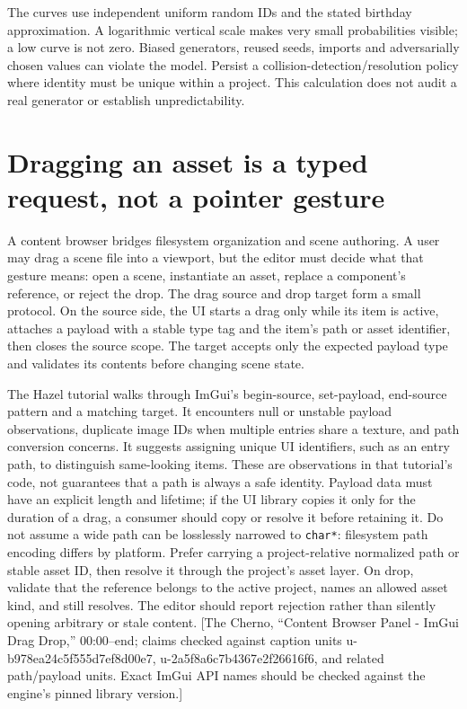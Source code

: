 The curves use independent uniform random IDs and the stated birthday approximation. A logarithmic vertical scale makes very small probabilities visible; a low curve is not zero. Biased generators, reused seeds, imports and adversarially chosen values can violate the model. Persist a collision-detection/resolution policy where identity must be unique within a project. This calculation does not audit a real generator or establish unpredictability.

\section{Dragging an asset is a typed request, not a pointer gesture}\label{06-engine-ii-ch047-dragging-an-asset-is-a-typed-request-not-a-pointer-gesture}

A content browser bridges filesystem organization and scene authoring. A user may drag a scene file into a viewport, but the editor must decide what that gesture means: open a scene, instantiate an asset, replace a component's reference, or reject the drop. The drag source and drop target form a small protocol. On the source side, the UI starts a drag only while its item is active, attaches a payload with a stable type tag and the item's path or asset identifier, then closes the source scope. The target accepts only the expected payload type and validates its contents before changing scene state.

The Hazel tutorial walks through ImGui's begin-source, set-payload, end-source pattern and a matching target. It encounters null or unstable payload observations, duplicate image IDs when multiple entries share a texture, and path conversion concerns. It suggests assigning unique UI identifiers, such as an entry path, to distinguish same-looking items. These are observations in that tutorial's code, not guarantees that a path is always a safe identity. Payload data must have an explicit length and lifetime; if the UI library copies it only for the duration of a drag, a consumer should copy or resolve it before retaining it. Do not assume a wide path can be losslessly narrowed to \texttt{char*}: filesystem path encoding differs by platform. Prefer carrying a project-relative normalized path or stable asset ID, then resolve it through the project's asset layer. On drop, validate that the reference belongs to the active project, names an allowed asset kind, and still resolves. The editor should report rejection rather than silently opening arbitrary or stale content. {[}The Cherno, ``Content Browser Panel - ImGui Drag Drop,'' 00:00--end; claims checked against caption units u-b978ea24c5f555d7ef8d00e7, u-2a5f8a6c7b4367e2f26616f6, and related path/payload units. Exact ImGui API names should be checked against the engine's pinned library version.{]}

